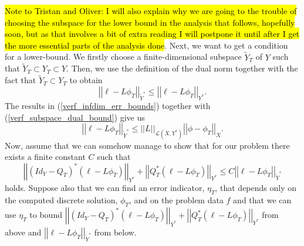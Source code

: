 \documentclass[12pt,a4paper]{article}
\theoremstyle{definition}
\begin{document}
  \hl{Note to Tristan and Oliver: I will also explain why we are going to the trouble of choosing the subspace for the lower bound in the analysis that follows, hopefully soon, but as that involves a bit of extra reading I will postpone it until after I get the more essential parts of the analysis done}. Next, we want to get a condition for a lower-bound.  We firstly choose a finite-dimensional subspace $\widetilde{Y}_T$ of $Y$ such that $\widetilde{Y}_T\subset Y_T\subset Y$.  Then, we use the definition of the dual norm 
 together with the fact that $\widetilde{Y}_T\subset Y_T$ to obtain
 \begin{equation}\label{verf_subspace_dual_bound}
\left|\left| \ell-L\phi_T\right|\right|_{\widetilde{Y}^*}\leq \left|\left| \ell-L\phi_T\right|\right|_{Y^*}.
 \end{equation}
 The results in (\ref{verf_infdim_err_bounds}) together with (\ref{verf_subspace_dual_bound}) give us
 \begin{equation}
\left|\left| \ell-L\phi_T\right|\right|_{\widetilde{Y}^*}\leq \left|\left|L\right|\right|_{\mathcal{L}\left(X,Y^*\right)}\left|\left|\phi-\phi_T\right|\right|_X.
 \end{equation}
 Now, assume that we can somehow manage to show that for our problem there exists a finite constant $C$ such that
 \begin{equation}
\left|\left| \left(Id_Y-Q_T\right)^*\left(\ell-L\phi_T\right)\right|\right|_{Y^*} +\left|\left| Q_T^*\left(\ell-L\phi_T\right)\right|\right|_{Y^*}\leq C \left|\left| \ell-L\phi_T\right|\right|_{\widetilde{Y}^*}
 \end{equation}
 holds. Suppose also that we can find an error indicator, $\eta_T$, that depends only on the computed discrete solution, $\phi_T$, and on the problem data $f$ and that we can use $\eta_T$ to bound $\left|\left| \left(Id_Y-Q_T\right)^*\left(\ell-L\phi_T\right)\right|\right|_{Y^*} +\left|\left| Q_T^*\left(\ell-L\phi_T\right)\right|\right|_{Y^*}$ from above and $\left|\left| \ell-L\phi_T\right|\right|_{\widetilde{Y}^*}$ from below.  
 
\end{document}
